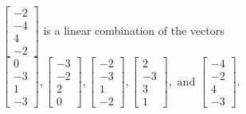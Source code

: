 \begin{exercise}
\begin{exerciseStatement}
  \end{exerciseStatement}
  \begin{exerciseAnswer}
   \(\left[\begin{array}{c}
-2 \\
-4 \\
4 \\
-2
\end{array}\right]\) 
  	 is  
	a linear combination of the vectors \(\left[\begin{array}{c}
0 \\
-3 \\
1 \\
-3
\end{array}\right] , \left[\begin{array}{c}
-3 \\
-2 \\
2 \\
0
\end{array}\right] , \left[\begin{array}{c}
-2 \\
-3 \\
1 \\
-2
\end{array}\right] , \left[\begin{array}{c}
2 \\
-3 \\
3 \\
1
\end{array}\right] , \text{ and } \left[\begin{array}{c}
-4 \\
-2 \\
4 \\
-3
\end{array}\right]\).

	
  


  \end{exerciseAnswer}
\end{exercise}